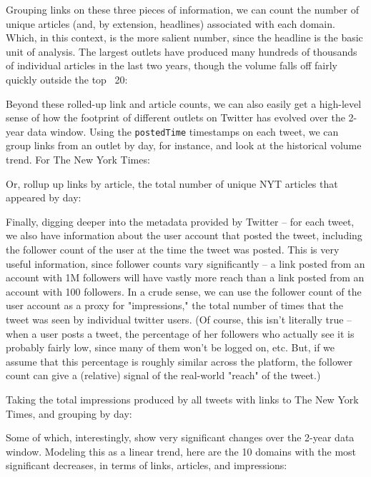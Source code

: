 \documentclass{scrartcl}
\begin{document}
Grouping links on these three pieces of information, we can count the number of unique articles (and, by extension, headlines) associated with each domain. Which, in this context, is the more salient number, since the headline is the basic unit of analysis. The largest outlets have produced many hundreds of thousands of individual articles in the last two years, though the volume falls off fairly quickly outside the top ~20:


Beyond these rolled-up link and article counts, we can also easily get a high-level sense of how the footprint of different outlets on Twitter has evolved over the 2-year data window. Using the \texttt{postedTime} timestamps on each tweet, we can group links from an outlet by day, for instance, and look at the historical volume trend. For The New York Times:


Or, rollup up links by article, the total number of unique NYT articles that appeared by day:


Finally, digging deeper into the metadata provided by Twitter -- for each tweet, we also have information about the user account that posted the tweet, including the follower count of the user at the time the tweet was posted. This is very useful information, since follower counts vary significantly -- a link posted from an account with 1M followers will have vastly more reach than a link posted from an account with 100 followers. In a crude sense, we can use the follower count of the user account as a proxy for "impressions," the total number of times that the tweet was seen by individual twitter users. (Of course, this isn't literally true -- when a user posts a tweet, the percentage of her followers who actually see it is probably fairly low, since many of them won't be logged on, etc. But, if we assume that this percentage is roughly similar across the platform, the follower count can give a (relative) signal of the real-world "reach" of the tweet.)

Taking the total impressions produced by all tweets with links to The New York Times, and grouping by day:


Some of which, interestingly, show very significant changes over the 2-year data window. Modeling this as a linear trend, here are the 10 domains with the most significant decreases, in terms of links, articles, and impressions:
\end{document}

